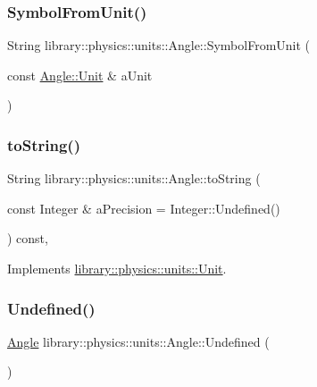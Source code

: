 \subsubsection{\texorpdfstring{Symbol\+From\+Unit()}{SymbolFromUnit()}}
{\footnotesize\ttfamily String library\+::physics\+::units\+::\+Angle\+::\+Symbol\+From\+Unit (\begin{DoxyParamCaption}\item[{const \hyperlink{classlibrary_1_1physics_1_1units_1_1_angle_a3c329d415a61783b16ce481874cc5956}{Angle\+::\+Unit} \&}]{a\+Unit }\end{DoxyParamCaption})\hspace{0.3cm}{\ttfamily [static]}}

\mbox{\label{classlibrary_1_1physics_1_1units_1_1_angle_aae6b7bd4e028ea7719f5a712ca19a86c}} 
\subsubsection{\texorpdfstring{to\+String()}{toString()}}
{\footnotesize\ttfamily String library\+::physics\+::units\+::\+Angle\+::to\+String (\begin{DoxyParamCaption}\item[{const Integer \&}]{a\+Precision = {\ttfamily Integer\+:\+:Undefined()} }\end{DoxyParamCaption}) const\hspace{0.3cm}{\ttfamily [override]}, {\ttfamily [virtual]}}



Implements \hyperlink{classlibrary_1_1physics_1_1units_1_1_unit_aac05cb6ed1ea7c18c233a3381c81caf8}{library\+::physics\+::units\+::\+Unit}.

\mbox{\label{classlibrary_1_1physics_1_1units_1_1_angle_a9c9a16c58d7e1e95e38cf2adf888f334}} 
\subsubsection{\texorpdfstring{Undefined()}{Undefined()}}
{\footnotesize\ttfamily \hyperlink{classlibrary_1_1physics_1_1units_1_1_angle}{Angle} library\+::physics\+::units\+::\+Angle\+::\+Undefined (\begin{DoxyParamCaption}{ }\end{DoxyParamCaption})\hspace{0.3cm}{\ttfamily [static]}}



